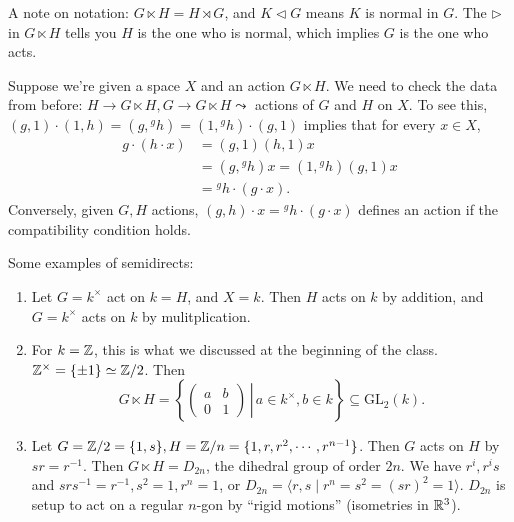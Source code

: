 \begin{note}
   A note on notation: $G\ltimes H = H \rtimes G$, and  $K \triangleleft G$ means $K$ is normal in $G$. The $\triangleright$ in $G\ltimes H$ tells you  $H$ is the one who is normal, which implies $G$ is the one who acts.
\end{note}
Suppose we're given a space $X$ and an action $G \ltimes H$. We need to check the data from before: $H \to G \ltimes H, G \to G\ltimes H \leadsto$ actions of $G$ and $H$ on $X$. To see this, $(g,1) \cdot (1,h) = (g,{}^g h) = (1,{}^g h) \cdot (g,1)  $ implies that for every $x \in X$, 
\begin{align*}
    g\cdot (h\cdot x) &= (g,1)(h,1) x\\
                      &=(g,{}^g h)x=(1,{}^g h)(g,1)x\\
                      &={}^g h \cdot (g\cdot x). 
\end{align*}
Conversely, given $G,H$ actions, $(g,h) \cdot x={}^g h\cdot (g\cdot x) $ defines an action if the compatibility condition holds.
\begin{example}
   Some examples of semidirects:
   \begin{enumerate}[label=(\arabic*)]
   \setlength\itemsep{-.2em}
       \item Let $G=k ^{\times }$ act on $k=H$, and $X=k.$ Then  $H$ acts on $k$ by addition, and $G= k ^{\times }$ acts on $k$ by mulitplication.
        \item For $k=\mathbb{Z}$, this is what we discussed at the beginning of the class. $\mathbb{Z} ^{\times }=\{\pm 1\} \simeq  \mathbb{Z}/2$. Then \[
        G \ltimes H = \left\{ 
        \left. \begin{pmatrix}
            a & b \\ 0 & 1
\end{pmatrix}\, \right|\, a \in k ^{\times }, b \in k\right\} \subseteq \mathrm{GL}_2(k).
        \] 
    \item Let $G= \mathbb{Z} /2= \{1,s\} , H = \mathbb{Z} /n = \{1,r,r^2, \cdots , r ^{n-1}\} $. Then $G$ acts on $H$ by ${}s r= r^{-1} $. Then $G \ltimes H = D_{2n}$, the dihedral group of order $2n$. We have $r^i , r^i  s$ and $s r s ^{-1} = r ^{-1}, s ^2=1, r^n =1$, or $D_{2n}=\langle  r,s \mid r ^n =s ^2=(s r)^2=1\rangle $. $D_{2n}$ is setup to act on a regular  $n$-gon by ``rigid motions'' (isometries in $\mathbb{R}^3$).
   \end{enumerate}
\end{example}
